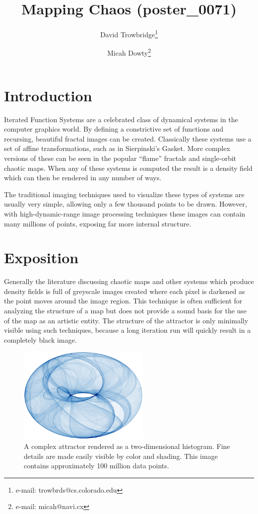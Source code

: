 \documentclass{acmsiggraph}
\title{Mapping Chaos (poster\_0071)}
\author{
  David Trowbridge\thanks{e-mail: trowbrds@cs.colorado.edu}
\and
  Micah Dowty\thanks{e-mail: micah@navi.cx}
}
\begin{document}
\maketitle

\section{Introduction}
\copyrightspace
Iterated Function Systems are a celebrated class of dynamical systems in the
computer graphics world. By defining a constrictive set of functions and
recursing, beautiful fractal images can be created. Classically these
systems use a set of affine transformations, such as in Sierpinski's Gasket.
More complex versions of these can be seen in the popular ``flame'' fractals
and single-orbit chaotic maps. When any of these systems is computed the
result is a density field which can then be rendered in any number of ways.

The traditional imaging techniques used to visualize these types of systems
are usually very simple, allowing only a few thousand points to be drawn.
However, with high-dynamic-range image processing techniques these images
can contain many millions of points, exposing far more internal structure.

\section{Exposition}
Generally the literature discussing chaotic maps and other systems which
produce density fields is full of greyscale images created where each pixel
is darkened as the point moves around the image region. This technique is
often sufficient for analyzing the structure of a map but does not provide
a sound basis for the use of the map as an artistic entity. The structure
of the attractor is only minimally visible using such techniques, because
a long iteration run will quickly result in a completely black image.

\begin{figure}[htb]
\centering
\includegraphics[width=2.5in]{1.png}
\caption{A complex attractor rendered as a two-dimensional histogram.
Fine details are made easily visible by color and shading. This image
contains approximately 100 million data points.}
\end{figure}
\end{document}

